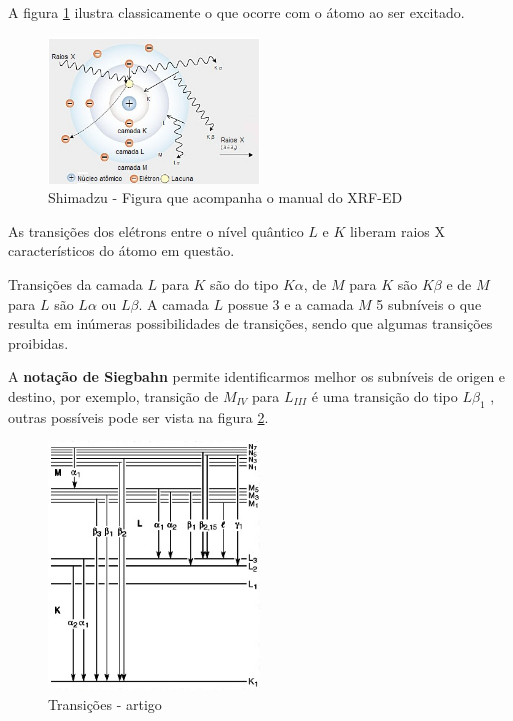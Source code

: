 A figura \ref{fig:shimadzu_atomo} ilustra classicamente o que ocorre com
o átomo ao ser excitado.

\begin{figure}[H]
\begin{center} 
  \includegraphics[width=0.5\textwidth]{../inputs/images/shimadzu_atomo.jpg}
  \caption{Shimadzu - Figura que acompanha o manual do XRF-ED \label{fig:shimadzu_atomo}}
\end{center}
\end{figure}


As transições dos elétrons entre o nível quântico $L$ e
$K$ liberam raios X característicos do átomo em questão. 

Transições da camada $L$ para $K$ são do tipo $K\alpha$, de $M$ para $K$ 
são $K\beta$ e de $M$ para $L$ são $L\alpha$ ou $L\beta$. 
A camada $L$ possue 3 e a camada $M$ 5 subníveis o que
resulta em inúmeras possibilidades de transições, sendo que algumas transições
proibidas. 

A \textbf{notação de Siegbahn} permite identificarmos melhor os subníveis
de origen e destino, por exemplo, transição de $M_{IV}$ para $L_{III}$ é uma transição do 
tipo $L\beta_1$ \citep{jenkins1991}, outras possíveis pode ser vista na
figura \ref{fig:siegbahn}. 

\begin{figure}[H]
\begin{center} 
  \includegraphics[width=0.5\textwidth]{../inputs/images/Siegbahn.jpg}
  \caption{Transições - artigo \citep{jenkins1991}  \label{fig:siegbahn}}
\end{center}
\end{figure}


